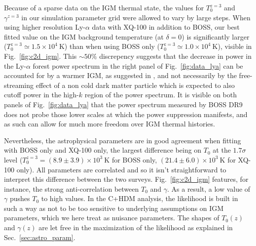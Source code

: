 Because of a sparse data on the IGM thermal state, the values for $T_0^{z=3}$ and $\gamma^{z=3}$ in our simulation parameter grid were allowed to vary by large steps. When using higher resolution Ly-$\alpha$ data with XQ-100 in addition to BOSS, our best fitted value on the IGM background temperature (at $\delta=0$) is significantly larger ($T_0^{z=3} \simeq 1.5 \times 10^4~\mathrm{K}$) than when using BOSS only ($T_0^{z=3} \simeq 1.0 \times 10^4~\mathrm{K}$), visible in Fig.~\ref{fig:c2d_igm}. This $\sim 50\%$ discrepency suggests that the decrease in power in the Ly-$\alpha$ forest power spectrum in the right panel of Fig.~\ref{fig:data_lya} can be accounted for by a warmer IGM, as suggested in \cite{warmIGM}, and not necessarily by the free-streaming effect of a non cold dark matter particle which is expected to also cutoff power in the high-$k$ region of the power spectrum. It is visible on both panels of Fig.~\ref{fig:data_lya} that the power spectrum measured by BOSS DR9 does not probe those lower scales at which the power suppression manifests, and as such can allow for much more freedom over IGM thermal histories. 


Nevertheless, the astrophysical parameters are in good agreement when fitting with BOSS only and XQ-100 only, the largest difference being on $T_0$ at the $1.7\sigma$ level ($T_0^{z=3} = (8.9 \pm 3.9) \times 10^3~\mathrm{K}$ for BOSS only, $(21.4 \pm 6.0) \times 10^3~\mathrm{K}$ for XQ-100 only). All parameters are correlated and so it isn't straightforward to interpret this difference between the two surveys. Fig.~\ref{fig:c2d_igm} features, for instance, the strong anti-correlation between $T_0$ and $\gamma$. As a result, a low value of $\gamma$  pushes $T_0$ to high values. In the C+HDM analysis, the likelihood is built in such a way as not to be too sensitive to underlying assumptions on IGM parameters, which we here treat as nuisance parameters. The shapes of $T_0(z)$ and $\gamma(z)$ are let free in the maximization of the likelihood as explained in Sec.~\ref{sec:astro_param}.
  
\clearpage
